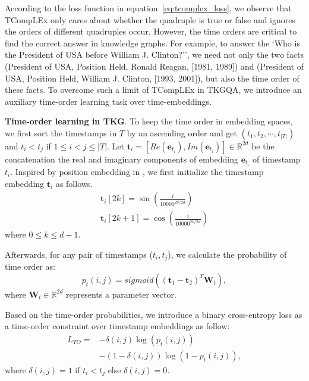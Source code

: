 \documentclass[11pt]{article}
\newcommand{\xhdr}[1]{{\noindent\bfseries #1}.}
\newcommand{\peng}[1]{{{\color{purple!60!blue}{[peng: #1]}}}}
\newcommand{\gt}[1]{{{\textcolor{cyan}{[gt: #1]}}}}
\begin{document}
According to the loss function in equation~\ref{eq:tcomplex_loss}, we observe that TCompLEx only cares about whether the quadruple is true or false and ignores the orders of different quadruples occur. However, the time orders are critical to find the correct answer in knowledge graphs. For example, to answer the `Who is the President of USA before William J. Clinton?'', we need not only the two facts (President of USA, Position Held, Ronald Reagan, [1981, 1989]) and (President of USA, Position Held, William J. Clinton, [1993, 2001]), but also the time order of these facts. To overcome such a limit of TCompLEx in TKGQA, we introduce an auxiliary time-order learning task over time-embeddings.


\xhdr{Time-order learning in TKG} To keep the time order in embedding spaces, we first sort the timestamps in $T$ by an ascending order and get $(t_1, t_2, \cdots, t_{|T|})$ and $t_i < t_j$ if $1\leq i < j \leq |T|$. Let $\bm{t}_i =  [Re(\bm{e}_{t_i}), Im(\bm{e}_{t_i})] \in \mathbb{R}^{2d}$ be the concatenation the real and imaginary components of embedding $\bm{e}_{t_i}$ of timestamp $t_i$. Inspired by position embedding in \cite{vaswani2017attention}, we first initialize the timestamp embedding $\bm{t}_i$ as follows.
\begin{equation}
\begin{aligned}
\bm{t}_{i}[2k] = \sin(\frac{i}{10000^{2k/2d}})\\
\bm{t}_{i}[2k + 1] = \cos(\frac{i}{10000^{2k/2d}})
\end{aligned}
\end{equation}
where $0\leq k \leq d-1$.

Afterwards, for any pair of timestamps ($t_i, t_j$),  we calculate the probability of time order as:
\begin{equation}
    p_{t}(i,j) = sigmoid((\bm{t}_1-\bm{t}_2)^T \bm{W}_{t}),
\end{equation}
where $\bm{W}_t \in \mathbb{R}^{2d}$ represents a parameter vector.

Based on the time-order probabilities, we introduce a binary cross-entropy loss as a time-order constraint over timestamp embeddings as follow:
\begin{equation}
\begin{aligned}
    L_{TO} =& -\delta(i, j)\log(p_{t}(i, j)) \\ &- (1 -\delta(i, j))\log(1 - p_{t}(i, j)),
    \end{aligned}
\end{equation}
where $\delta(i,j) = 1$ if $t_i < t_j$ else $\delta(i,j) = 0$.
\end{document}
